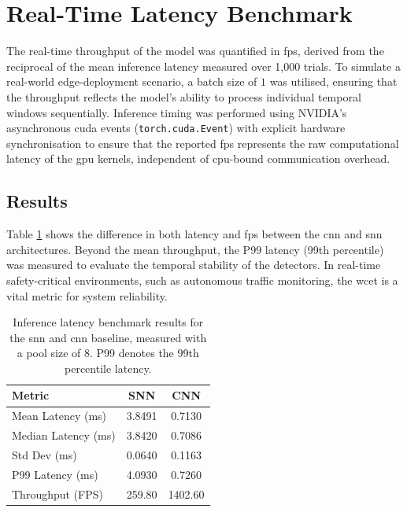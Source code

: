\section{Real-Time Latency Benchmark}
\label{subsec:exp_latency}

The real-time throughput of the model was quantified in \gls{fps}, derived from the reciprocal of the mean inference latency measured over 1,000 trials. 
To simulate a real-world edge-deployment scenario, a batch size of $1$ was utilised, ensuring that the throughput
reflects the model's ability to process individual temporal windows
sequentially. 
Inference timing was performed using NVIDIA's asynchronous \gls{cuda}
events (\texttt{torch.cuda.Event}) with explicit hardware synchronisation to
ensure that the reported \gls{fps} represents the raw computational latency of
the \gls{gpu} kernels, independent of \gls{cpu}-bound communication overhead.

\subsection*{Results}

Table \ref{tab:latency_benchmark} shows the difference in both latency and \gls{fps} between the \gls{cnn} and \gls{snn} architectures.
Beyond the mean throughput, the P99 latency (99th percentile) was
measured to evaluate the temporal stability of the detectors. In real-time
safety-critical environments, such as autonomous traffic monitoring, the
\gls{wcet} is a vital metric for system reliability.

\begin{table}[h]
\centering
\begin{tabular}{|l|c|c|}
\hline
\textbf{Metric} & \textbf{SNN} & \textbf{CNN} \\
\hline
Mean Latency (ms)   & 3.8491 & 0.7130 \\
Median Latency (ms) & 3.8420 & 0.7086 \\
Std Dev (ms)        & 0.0640 & 0.1163 \\
P99 Latency (ms)    & 4.0930 & 0.7260 \\
Throughput (FPS)    & 259.80 & 1402.60 \\
\hline
\end{tabular}
\caption[Inference Latency Benchmark]{Inference latency benchmark results for the \gls{snn} and \gls{cnn} baseline, measured with a pool size of 8. P99 denotes the 99th percentile latency.}
\label{tab:latency_benchmark}
\end{table}

